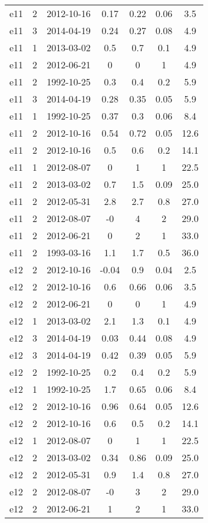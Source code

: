 \begin{table*}[htp]
\begin{tabular}{ccccccc}
e11 & 2 & 2012-10-16 & 0.17 & 0.22 & 0.06 & 3.5 \\
e11 & 3 & 2014-04-19 & 0.24 & 0.27 & 0.08 & 4.9 \\
e11 & 1 & 2013-03-02 & 0.5 & 0.7 & 0.1 & 4.9 \\
e11 & 2 & 2012-06-21 & 0 & 0 & 1 & 4.9 \\
e11 & 2 & 1992-10-25 & 0.3 & 0.4 & 0.2 & 5.9 \\
e11 & 3 & 2014-04-19 & 0.28 & 0.35 & 0.05 & 5.9 \\
e11 & 1 & 1992-10-25 & 0.37 & 0.3 & 0.06 & 8.4 \\
e11 & 2 & 2012-10-16 & 0.54 & 0.72 & 0.05 & 12.6 \\
e11 & 2 & 2012-10-16 & 0.5 & 0.6 & 0.2 & 14.1 \\
e11 & 1 & 2012-08-07 & 0 & 1 & 1 & 22.5 \\
e11 & 2 & 2013-03-02 & 0.7 & 1.5 & 0.09 & 25.0 \\
e11 & 2 & 2012-05-31 & 2.8 & 2.7 & 0.8 & 27.0 \\
e11 & 2 & 2012-08-07 & -0 & 4 & 2 & 29.0 \\
e11 & 2 & 2012-06-21 & 0 & 2 & 1 & 33.0 \\
e11 & 2 & 1993-03-16 & 1.1 & 1.7 & 0.5 & 36.0 \\
e12 & 2 & 2012-10-16 & -0.04 & 0.9 & 0.04 & 2.5 \\
e12 & 2 & 2012-10-16 & 0.6 & 0.66 & 0.06 & 3.5 \\
e12 & 2 & 2012-06-21 & 0 & 0 & 1 & 4.9 \\
e12 & 1 & 2013-03-02 & 2.1 & 1.3 & 0.1 & 4.9 \\
e12 & 3 & 2014-04-19 & 0.03 & 0.44 & 0.08 & 4.9 \\
e12 & 3 & 2014-04-19 & 0.42 & 0.39 & 0.05 & 5.9 \\
e12 & 2 & 1992-10-25 & 0.2 & 0.4 & 0.2 & 5.9 \\
e12 & 1 & 1992-10-25 & 1.7 & 0.65 & 0.06 & 8.4 \\
e12 & 2 & 2012-10-16 & 0.96 & 0.64 & 0.05 & 12.6 \\
e12 & 2 & 2012-10-16 & 0.6 & 0.5 & 0.2 & 14.1 \\
e12 & 1 & 2012-08-07 & 0 & 1 & 1 & 22.5 \\
e12 & 2 & 2013-03-02 & 0.34 & 0.86 & 0.09 & 25.0 \\
e12 & 2 & 2012-05-31 & 0.9 & 1.4 & 0.8 & 27.0 \\
e12 & 2 & 2012-08-07 & -0 & 3 & 2 & 29.0 \\
e12 & 2 & 2012-06-21 & 1 & 2 & 1 & 33.0 \\

\end{tabular}
\end{table*}
